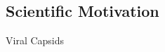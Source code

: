 \documentclass{beamer}
\begin{document}
\subsection{Scientific Motivation}
\begin{frame}{Viral Capsids}
\begin{columns}
    \begin{column}{0.48\textwidth}

    \end{column}
    \begin{column}{0.48\textwidth}
    \end{column}
\end{columns}
\end{frame}
\end{document}
